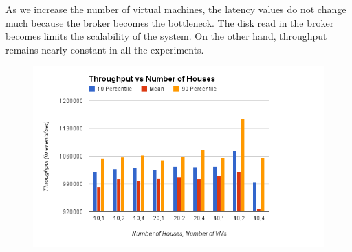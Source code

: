 As we increase the number of virtual machines, the latency values do not change much because the broker becomes the bottleneck. The disk read in the broker becomes limits the scalability of the system. On the other hand, throughput remains nearly constant in all the experiments.

\begin{figure}[h]
\begin{center}
	\includegraphics[scale=0.45]{img/q1_throughput}
\end{center}
\end{figure}